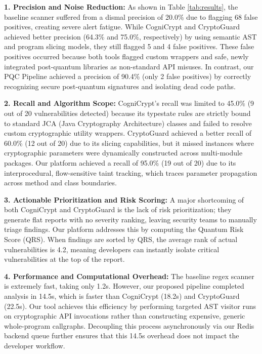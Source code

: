 \documentclass[conference]{IEEEtran}
\begin{document}
\textbf{1. Precision and Noise Reduction:}
As shown in Table \ref{tab:results}, the baseline scanner suffered from a dismal precision of 20.0\% due to flagging 68 false positives, creating severe alert fatigue. While CogniCrypt and CryptoGuard achieved better precision (64.3\% and 75.0\%, respectively) by using semantic AST and program slicing models, they still flagged 5 and 4 false positives. These false positives occurred because both tools flagged custom wrappers and safe, newly integrated post-quantum libraries as non-standard API misuses. In contrast, our PQC Pipeline achieved a precision of 90.4\% (only 2 false positives) by correctly recognizing secure post-quantum signatures and isolating dead code paths.

\textbf{2. Recall and Algorithm Scope:}
CogniCrypt's recall was limited to 45.0\% (9 out of 20 vulnerabilities detected) because its typestate rules are strictly bound to standard JCA (Java Cryptography Architecture) classes and failed to resolve custom cryptographic utility wrappers. CryptoGuard achieved a better recall of 60.0\% (12 out of 20) due to its slicing capabilities, but it missed instances where cryptographic parameters were dynamically constructed across multi-module packages. Our platform achieved a recall of 95.0\% (19 out of 20) due to its interprocedural, flow-sensitive taint tracking, which traces parameter propagation across method and class boundaries.

\textbf{3. Actionable Prioritization and Risk Scoring:}
A major shortcoming of both CogniCrypt and CryptoGuard is the lack of risk prioritization; they generate flat reports with no severity ranking, leaving security teams to manually triage findings. Our platform addresses this by computing the Quantum Risk Score (QRS). When findings are sorted by QRS, the average rank of actual vulnerabilities is 4.2, meaning developers can instantly isolate critical vulnerabilities at the top of the report.

\textbf{4. Performance and Computational Overhead:}
The baseline regex scanner is extremely fast, taking only 1.2s. However, our proposed pipeline completed analysis in 14.5s, which is faster than CogniCrypt (18.2s) and CryptoGuard (22.5s). Our tool achieves this efficiency by performing targeted AST visitor runs on cryptographic API invocations rather than constructing expensive, generic whole-program callgraphs. Decoupling this process asynchronously via our Redis backend queue further ensures that this 14.5s overhead does not impact the developer workflow.
\end{document}
